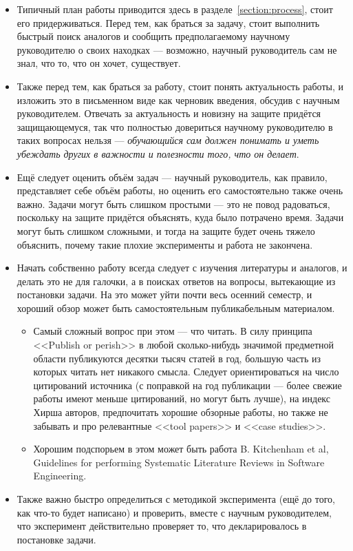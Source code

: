 \documentclass{article}
\begin{document}
\begin{itemize}
    \item Типичный план работы приводится здесь в разделе~\ref{section:process}, стоит его придерживаться. Перед тем, как браться за задачу, стоит выполнить быстрый поиск аналогов и сообщить предполагаемому научному руководителю о своих находках --- возможно, научный руководитель сам не знал, что то, что он хочет, существует.
    \item Также перед тем, как браться за работу, стоит понять актуальность работы, и изложить это в письменном виде как черновик введения, обсудив с научным руководителем. Отвечать за актуальность и новизну на защите придётся защищающемуся, так что полностью довериться научному руководителю в таких вопросах нельзя --- \emph{обучающийся сам должен понимать и уметь убеждать других в важности и полезности того, что он делает}.
    \item Ещё следует оценить объём задач --- научный руководитель, как правило, представляет себе объём работы, но оценить его самостоятельно также очень важно. Задачи могут быть слишком простыми --- это не повод радоваться, поскольку на защите придётся объяснять, куда было потрачено время. Задачи могут быть слишком сложными, и тогда на защите будет очень тяжело объяснить, почему такие плохие эксперименты и работа не закончена.
    \item Начать собственно работу всегда следует с изучения литературы и аналогов, и делать это не для галочки, а в поисках ответов на вопросы, вытекающие из постановки задачи. На это может уйти почти весь осенний семестр, и хороший обзор может быть самостоятельным публикабельным материалом.
    \begin{itemize}
        \item Самый сложный вопрос при этом --- что читать. В силу принципа <<Publish or perish>> в любой сколько-нибудь значимой предметной области публикуются десятки тысяч статей в год, большую часть из которых читать нет никакого смысла. Следует ориентироваться на число цитирований источника (с поправкой на год публикации --- более свежие работы имеют меньше цитирований, но могут быть лучше), на индекс Хирша авторов, предпочитать хорошие обзорные работы, но также не забывать и про релевантные <<tool papers>> и <<case studies>>. 
        \item Хорошим подспорьем в этом может быть работа B. Kitchenham et al, Guidelines for performing Systematic Literature Reviews in Software Engineering.
    \end{itemize}
    \item Также важно быстро определиться с методикой эксперимента (ещё до того, как что-то будет написано) и проверить, вместе с научным руководителем, что эксперимент действительно проверяет то, что декларировалось в постановке задачи.

\end{itemize}
\end{document}
